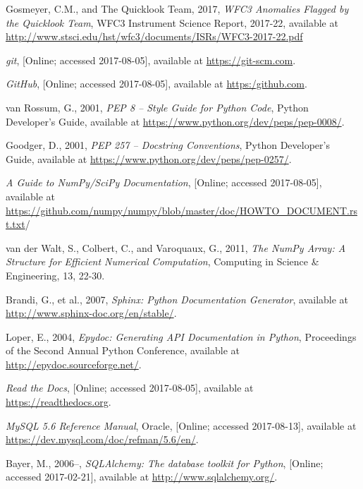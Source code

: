 \documentclass[10pt,journal,compsoc]{IEEEtran}
\begin{document}
\begin{thebibliography}{1}
Gosmeyer, C.M., and The Quicklook Team, 2017, \emph{WFC3 Anomalies Flagged by the Quicklook Team},
WFC3 Instrument Science Report, 2017-22, available at \textcolor{blue}{\url{http://www.stsci.edu/hst/wfc3/documents/ISRs/WFC3-2017-22.pdf}}

\emph{git}, [Online; accessed 2017-08-05], available at \textcolor{blue}{\url{https://git-scm.com}}.

\emph{GitHub}, [Online; accessed 2017-08-05], available at \textcolor{blue}{\url{https:/github.com}}.

van Rossum, G., 2001, \emph{PEP 8 -- Style Guide for Python Code}, Python Developer's Guide,
available at \textcolor{blue}{\url{https://www.python.org/dev/peps/pep-0008/}}.

Goodger, D., 2001, \emph{PEP 257 -- Docstring Conventions}, Python Developer's Guide,
available at \textcolor{blue}{\url{https://www.python.org/dev/peps/pep-0257/}}.

\emph{A Guide to NumPy/SciPy Documentation}, [Online; accessed 2017-08-05], available at
\textcolor{blue}{\url{https://github.com/numpy/numpy/blob/master/doc/HOWTO_DOCUMENT.rst.txt}}/

van der Walt, S., Colbert, C., and Varoquaux, G., 2011, \emph{The NumPy Array: A Structure for
Efficient Numerical Computation}, Computing in Science \& Engineering, 13, 22-30.

Brandi, G., et al., 2007, \emph{Sphinx: Python Documentation Generator}, available at
\textcolor{blue}{\url{http://www.sphinx-doc.org/en/stable/}}.

Loper, E., 2004, \emph{Epydoc: Generating API Documentation in Python}, Proceedings of the
Second Annual Python Conference, available at \textcolor{blue}{\url{http://epydoc.sourceforge.net/}}.

\emph{Read the Docs}, [Online; accessed 2017-08-05], available at \textcolor{blue}{\url{https://readthedocs.org}}.

\emph{MySQL 5.6 Reference Manual}, Oracle, [Online; accessed 2017-08-13], available at
\textcolor{blue}{\url{https://dev.mysql.com/doc/refman/5.6/en/}}.

Bayer, M., 2006–, \emph{SQLAlchemy: The database toolkit for Python}, [Online; accessed 2017-02-21],
available at \textcolor{blue}{\url{http://www.sqlalchemy.org/}}.


\end{thebibliography}
\end{document}
